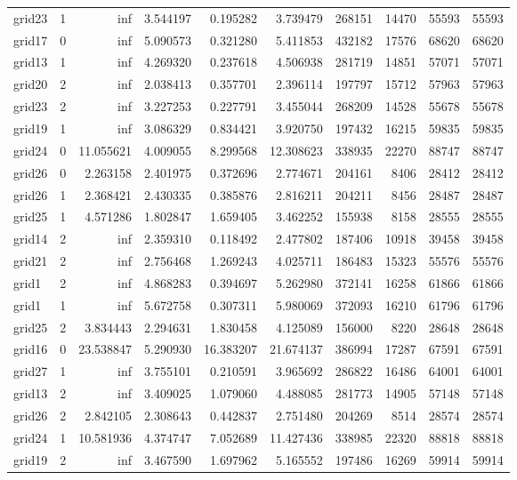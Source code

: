 \begin{longtable}{|l|r|r|r|r|r|r|r|r|r|}
grid23 & 1 & inf & 3.544197 & 0.195282 & 3.739479 & 268151 & 14470 & 55593 & 55593 \\
grid17 & 0 & inf & 5.090573 & 0.321280 & 5.411853 & 432182 & 17576 & 68620 & 68620 \\
grid13 & 1 & inf & 4.269320 & 0.237618 & 4.506938 & 281719 & 14851 & 57071 & 57071 \\
grid20 & 2 & inf & 2.038413 & 0.357701 & 2.396114 & 197797 & 15712 & 57963 & 57963 \\
grid23 & 2 & inf & 3.227253 & 0.227791 & 3.455044 & 268209 & 14528 & 55678 & 55678 \\
grid19 & 1 & inf & 3.086329 & 0.834421 & 3.920750 & 197432 & 16215 & 59835 & 59835 \\
grid24 & 0 & 11.055621 & 4.009055 & 8.299568 & 12.308623 & 338935 & 22270 & 88747 & 88747 \\
grid26 & 0 & 2.263158 & 2.401975 & 0.372696 & 2.774671 & 204161 & 8406 & 28412 & 28412 \\
grid26 & 1 & 2.368421 & 2.430335 & 0.385876 & 2.816211 & 204211 & 8456 & 28487 & 28487 \\
grid25 & 1 & 4.571286 & 1.802847 & 1.659405 & 3.462252 & 155938 & 8158 & 28555 & 28555 \\
grid14 & 2 & inf & 2.359310 & 0.118492 & 2.477802 & 187406 & 10918 & 39458 & 39458 \\
grid21 & 2 & inf & 2.756468 & 1.269243 & 4.025711 & 186483 & 15323 & 55576 & 55576 \\
grid1 & 2 & inf & 4.868283 & 0.394697 & 5.262980 & 372141 & 16258 & 61866 & 61866 \\
grid1 & 1 & inf & 5.672758 & 0.307311 & 5.980069 & 372093 & 16210 & 61796 & 61796 \\
grid25 & 2 & 3.834443 & 2.294631 & 1.830458 & 4.125089 & 156000 & 8220 & 28648 & 28648 \\
grid16 & 0 & 23.538847 & 5.290930 & 16.383207 & 21.674137 & 386994 & 17287 & 67591 & 67591 \\
grid27 & 1 & inf & 3.755101 & 0.210591 & 3.965692 & 286822 & 16486 & 64001 & 64001 \\
grid13 & 2 & inf & 3.409025 & 1.079060 & 4.488085 & 281773 & 14905 & 57148 & 57148 \\
grid26 & 2 & 2.842105 & 2.308643 & 0.442837 & 2.751480 & 204269 & 8514 & 28574 & 28574 \\
grid24 & 1 & 10.581936 & 4.374747 & 7.052689 & 11.427436 & 338985 & 22320 & 88818 & 88818 \\
grid19 & 2 & inf & 3.467590 & 1.697962 & 5.165552 & 197486 & 16269 & 59914 & 59914 \\

\end{longtable}
